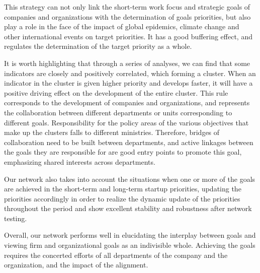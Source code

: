 \documentclass[12pt]{article}  %
\begin{document}
This strategy can not only link the short-term work focus and strategic goals of companies and organizations with the determination of goals priorities, but also play a role in the face of the impact of global epidemics, climate change and other international events on target priorities. It has a good buffering effect, and regulates the determination of the target priority as a whole.

It is worth highlighting that through a series of analyses, we can find that some indicators are closely and positively correlated, which forming a cluster. When  an indicator in the cluster is given higher priority and develops faster, it will have a positive driving effect on the development of the entire cluster. This rule corresponds to the development of companies and organizations, and represents the collaboration between different departments or units corresponding to different goals. Responsibility for the policy areas of the various objectives that make up the clusters falls to different ministries. Therefore, bridges of collaboration need to be built between departments, and active linkages between the goals they are responsible for are good entry points to promote this goal, emphasizing shared interests across departments.

Our network also takes into account the situations when one or more of the goals are achieved in the short-term and long-term startup priorities, updating the priorities accordingly in order to realize the dynamic update of the priorities throughout the period and show excellent stability and robustness after network testing.

Overall, our network performs well in elucidating the interplay between goals and viewing firm and organizational goals as an indivisible whole. Achieving the goals requires the concerted efforts of all departments of the company and the organization, and the impact of the alignment.
\end{document}
